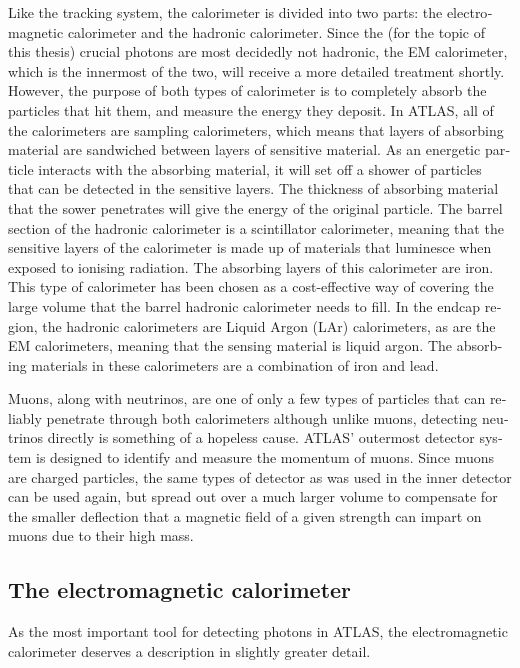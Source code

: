 \begin{english}
Like the tracking system, the calorimeter is divided into two parts: the electromagnetic calorimeter and the hadronic calorimeter. Since the (for the topic of this thesis) crucial photons are most decidedly not hadronic, the EM calorimeter, which is the innermost of the two, will receive a more detailed treatment shortly. However, the purpose of both types of calorimeter is to completely absorb the particles that hit them, and measure the energy they deposit. In ATLAS, all of the calorimeters are sampling calorimeters, which means that layers of absorbing material are sandwiched between layers of sensitive material. As an energetic particle interacts with the absorbing material, it will set off a shower of particles that can be detected in the sensitive layers. The thickness of absorbing material that the sower penetrates will give the energy of the original particle. The barrel section of the hadronic calorimeter is a scintillator calorimeter, meaning that the sensitive layers of the calorimeter is made up of materials that luminesce when exposed to ionising radiation. The absorbing layers of this calorimeter are iron. This type of calorimeter has been chosen as a cost-effective way of covering the large volume that the barrel hadronic calorimeter needs to fill. In the endcap region, the hadronic calorimeters are Liquid Argon (LAr) calorimeters, as are the EM calorimeters, meaning that the sensing material is liquid argon. The absorbing materials in these calorimeters are a combination of iron and lead.

Muons, along with neutrinos, are one of only a few types of particles that can reliably penetrate through both calorimeters although unlike muons, detecting neutrinos directly is something of a hopeless cause. ATLAS' outermost detector system is designed to identify and measure the momentum of muons. Since muons are charged particles, the same types of detector as was used in the inner detector can be used again, but spread out over a much larger volume to compensate for the smaller deflection that a magnetic field of a given strength can impart on muons due to their high mass.

\subsection{The electromagnetic calorimeter}

As the most important tool for detecting photons in ATLAS, the electromagnetic calorimeter deserves a description in slightly greater detail.


\end{english}
